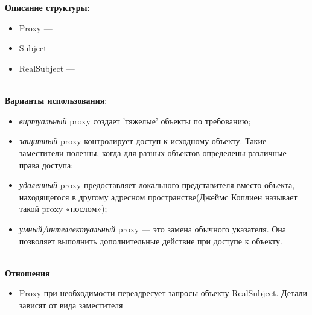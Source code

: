 \documentclass[a3paper,11pt]{report}
\renewcommand{\unidirectionalAssociation}[4]{
	\draw [umlcd style, ->, umlcdNS] (#1) -- (#4)
	node[near end, above]{#2}
	node[near end, below]{#3};
}
\begin{document}
\\\\
\textbf{Описание структуры}:
\begin{itemize}
\item Proxy ---
\item Subject ---
\item RealSubject ---
\end{itemize}

\large\textbf{\\Варианты использования}:
\begin{itemize}
\item \emph{виртуальный} proxy создает ’тяжелые’ объекты по требованию;
\item \emph{защитный} proxy  контролирует доступ к исходному объекту. Такие заместители полезны, когда для разных объектов определены различные права доступа;
\item \emph{удаленный} proxy  предоставляет локального представителя вместо объекта, находящегося в другому адресном пространстве(Джеймс Коплиен называет такой proxy «послом»);
\item \emph{умный/интеллектуальный} proxy --- это замена обычного указателя. Она позволяет выполнить дополнительные действие при доступе к объекту.
\end{itemize}

\textbf{\\Отношения}
\begin{itemize}
\item Proxy при необходимости переадресует запросы объекту RealSubject. Детали зависят от вида заместителя
\end{itemize}
\end{document}

